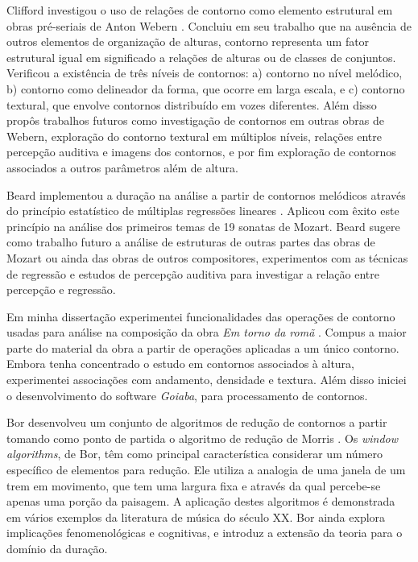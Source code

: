 \documentclass[12pt]{article}
\newcommand{\eng}[1]{\textit{#1}}
\newcommand{\goiaba}[0]{\textit{Goiaba}}
\newcommand{\obra}[0]{\textit{Em torno da romã}}
\begin{document}
Clifford investigou o uso de relações de contorno como elemento
estrutural em obras pré-seriais de Anton Webern
\cite{clifford95:contour}. Concluiu em seu trabalho que na ausência de
outros elementos de organização de alturas, contorno representa um
fator estrutural igual em significado a relações de alturas ou de
classes de conjuntos. Verificou a existência de três níveis de
contornos: a) contorno no nível melódico, b) contorno como delineador
da forma, que ocorre em larga escala, e c) contorno textural, que
envolve contornos distribuído em vozes diferentes. Além disso propôs
trabalhos futuros como investigação de contornos em outras obras de
Webern, exploração do contorno textural em múltiplos níveis, relações
entre percepção auditiva e imagens dos contornos, e por fim exploração
de contornos associados a outros parâmetros além de altura.


Beard implementou a duração na análise a partir de contornos melódicos
através do princípio estatístico de múltiplas regressões lineares
\cite{beard03:contour}. Aplicou com êxito este princípio na análise
dos primeiros temas de 19 sonatas de Mozart. Beard sugere como
trabalho futuro a análise de estruturas de outras partes das obras de
Mozart ou ainda das obras de outros compositores, experimentos com as
técnicas de regressão e estudos de percepção auditiva para investigar
a relação entre percepção e regressão.


Em minha dissertação experimentei funcionalidades das operações de
contorno usadas para análise na composição da obra \obra{}
\cite{sampaio08:em}. Compus a maior parte do material da obra a partir
de operações aplicadas a um único contorno. Embora tenha concentrado o
estudo em contornos associados à altura, experimentei associações com
andamento, densidade e textura. Além disso iniciei o desenvolvimento
do software \goiaba{}, para processamento de contornos.


Bor \cite{bor09:contour} desenvolveu um conjunto de algoritmos de
redução de contornos a partir tomando como ponto de partida o
algoritmo de redução de Morris \cite{morris93:directions}. Os
\eng{window algorithms}, de Bor, têm como principal característica
considerar um número específico de elementos para redução. Ele utiliza
a analogia de uma janela de um trem em movimento, que tem uma largura
fixa e através da qual percebe-se apenas uma porção da paisagem. A
aplicação destes algoritmos é demonstrada em vários exemplos da
literatura de música do século XX. Bor ainda explora implicações
fenomenológicas e cognitivas, e introduz a extensão da teoria para o
domínio da duração.
\end{document}

